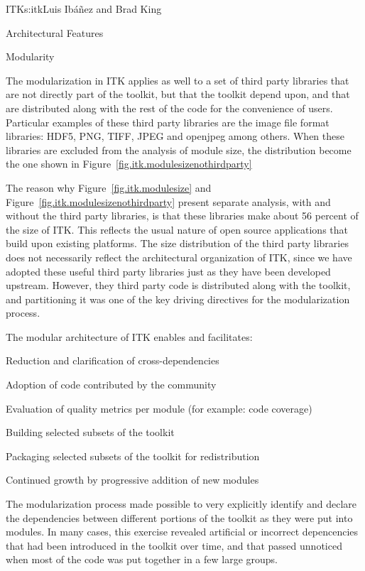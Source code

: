 \begin{aosachapter}{ITK}{s:itk}{Luis Ib\'{a}\~{n}ez and Brad King}
\begin{aosasect1}{Architectural Features}
\begin{aosasect2}{Modularity}

The modularization in ITK applies as well to a set of third party libraries
that are not directly part of the toolkit, but that the toolkit depend upon, and
that are distributed along with the rest of the code for the convenience of
users. Particular examples of these third party libraries are the image file
format libraries: HDF5, PNG, TIFF, JPEG and openjpeg among others. When these
libraries are excluded from the analysis of module size, the distribution
become the one shown in Figure~\ref{fig.itk.modulesizenothirdparty}

The reason why Figure~\ref{fig.itk.modulesize} and
Figure~\ref{fig.itk.modulesizenothirdparty} present separate analysis, with and
without the third party libraries, is that these libraries make about 56
percent of the size of ITK. This reflects the usual nature of open source
applications that build upon existing platforms. The size distribution of the
third party libraries does not necessarily reflect the architectural
organization of ITK, since we have adopted these useful third party libraries
just as they have been developed upstream. However, they third party code is
distributed along with the toolkit, and partitioning it was one of the key
driving directives for the modularization process.

The modular architecture of ITK enables and facilitates:

\begin{aosaitemize}
\item Reduction and clarification of cross-dependencies
\item Adoption of code contributed by the community
\item Evaluation of quality metrics per module (for example: code coverage)
\item Building selected subsets of the toolkit
\item Packaging selected subsets of the toolkit for redistribution
\item Continued growth by progressive addition of new modules
\end{aosaitemize}
\end{aosasect2}

The modularization process made possible to very explicitly identify and
declare the dependencies between different portions of the toolkit as they were
put into modules. In many cases, this exercise revealed artificial or incorrect
depencencies that had been introduced in the toolkit over time, and that passed
unnoticed when most of the code was put together in a few large groups.


\end{aosasect1}
\end{aosachapter}
